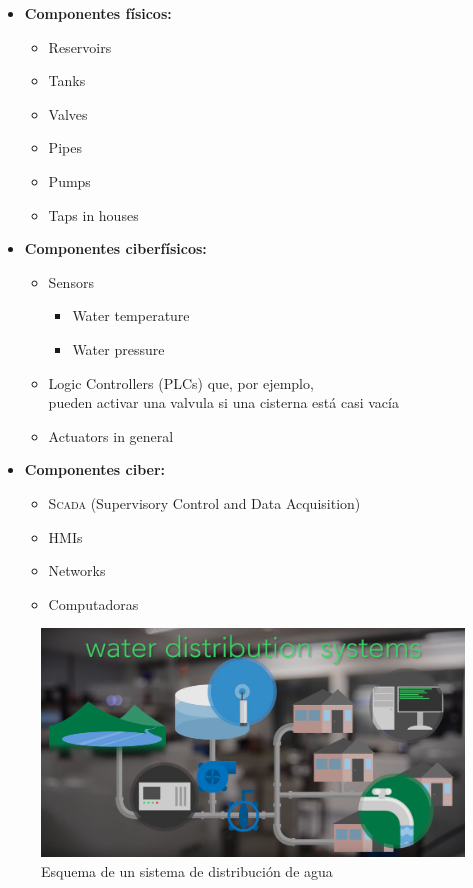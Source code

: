 \begin{paracol}{2}
   
\begin{itemize}
   \item \textbf{Componentes físicos:}
   \begin{itemize}
      \item Reservoirs
      \item Tanks
      \item Valves
      \item Pipes
      \item Pumps
      \item Taps in houses
   \end{itemize}
   \item \textbf{Componentes ciberfísicos:}
   \begin{itemize}
      \item Sensors
      \begin{itemize}
         \item Water temperature
         \item Water pressure
      \end{itemize}
      \item Logic Controllers (PLCs) que, por ejemplo,\\ pueden activar una valvula si una cisterna está casi vacía 
      \item Actuators in general
   \end{itemize}
   \item \textbf{Componentes ciber:}
   \begin{itemize}
      \item \textsc{Scada} (Supervisory Control and Data Acquisition)
      \item HMIs
      \item Networks
      \item Computadoras
   \end{itemize}
\end{itemize}
\switchcolumn
\colfill
\begin{figure}[htbp]
   \centering
   \includegraphics[width=0.95\columnwidth]{images/aguadistribucion.png}
   \caption{Esquema de un sistema de distribución de agua}
   \label{fig:aguadistribucion}
\end{figure}
\colfill

\end{paracol}

